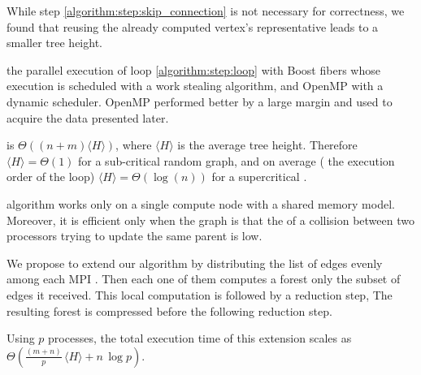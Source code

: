 While step \ref{algorithm:step:skip_connection} is not necessary for correctness, we found that
reusing the already computed vertex's representative leads to a smaller tree height. 

 the parallel execution of loop \ref{algorithm:step:loop} with  Boost fibers
\cite{Boost}
whose execution is scheduled with a work stealing algorithm, and OpenMP with a dynamic scheduler.
OpenMP performed better by a large margin and  used to acquire the data presented later.

 is $\Theta((n + m)\langle H \rangle)$, where $\langle H \rangle$
is
the average tree height. Therefore $\langle H \rangle = \Theta(1)$ for a sub-critical random graph,
and on average ( the execution order of the loop) $\langle H \rangle = \Theta(\log(n))$
for a supercritical  \cite{RandomGraph}.

 algorithm \label{algorithm:cc2} works only on a single compute node with a shared memory model.
Moreover, it is efficient
only when the graph is  that the  of a collision between two processors
trying to update the same parent is low.

We propose to extend our algorithm by distributing the list of edges evenly among each MPI .
Then each one of them computes a forest  only the subset of edges it received. This local
computation
is followed by a reduction step,  
The resulting forest is  compressed  before the following reduction step.

Using $p$ processes, the total execution time of this extension scales as $\Theta(\frac{(m +
n)}{p}\, \langle H \rangle + n\,\log p)$.

